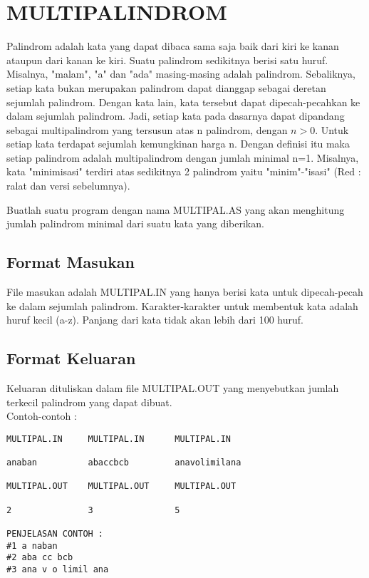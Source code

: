 \documentclass[a4paper,10pt,makeidx]{article}
\begin{document}
\section{MULTIPALINDROM}
\par
\indent
\indent
Palindrom adalah kata yang dapat dibaca sama saja baik dari kiri ke kanan
ataupun dari kanan ke kiri. Suatu palindrom sedikitnya berisi satu huruf.
Misalnya, "malam", "a" dan "ada" masing-masing adalah palindrom. Sebaliknya,
setiap kata bukan merupakan palindrom dapat dianggap sebagai deretan sejumlah
palindrom. Dengan kata lain, kata tersebut dapat dipecah-pecahkan ke dalam
sejumlah palindrom. Jadi, setiap kata pada dasarnya dapat dipandang sebagai
multipalindrom yang tersusun atas n palindrom, dengan $n > 0$. Untuk setiap
kata terdapat sejumlah kemungkinan harga n. Dengan definisi itu maka setiap
palindrom adalah multipalindrom dengan jumlah minimal n=1. Misalnya, kata
"minimisasi" terdiri atas sedikitnya 2 palindrom yaitu "minim"-"isasi"
(Red : ralat dan versi sebelumnya).
\par
\indent
\indent
Buatlah suatu program dengan nama MULTIPAL.AS yang akan menghitung jumlah
palindrom minimal dari suatu kata yang diberikan.
\subsection{Format Masukan}
\par
\indent
\indent
File masukan adalah MULTIPAL.IN yang hanya berisi kata untuk dipecah-pecah ke
dalam sejumlah palindrom. Karakter-karakter untuk membentuk kata adalah huruf
kecil (a-z). Panjang dari kata tidak akan lebih dari 100 huruf.
\subsection{Format Keluaran}
\par
\indent
\indent
Keluaran dituliskan dalam file MULTIPAL.OUT yang menyebutkan jumlah terkecil
palindrom yang dapat dibuat. \\

Contoh-contoh : \\

\begin{verbatim}
MULTIPAL.IN     MULTIPAL.IN      MULTIPAL.IN

anaban          abaccbcb         anavolimilana

MULTIPAL.OUT    MULTIPAL.OUT     MULTIPAL.OUT

2               3                5

PENJELASAN CONTOH :
#1 a naban
#2 aba cc bcb
#3 ana v o limil ana

\end{verbatim}
\end{document}
